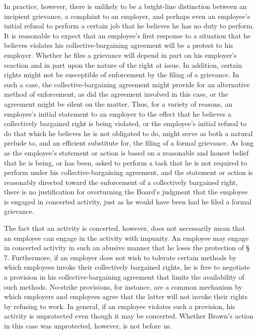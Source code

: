 \documentclass[
  letterpaper,
  11pt,
  DIV=9,
  openright]{scrbook}
\begin{document}
In practice, however, there is unlikely to be a bright-line distinction
between an incipient grievance, a complaint to an employer, and perhaps
even an employee's initial refusal to perform a certain job that he
believes he has no duty to perform. It is reasonable to expect that an
employee's first response to a situation that he believes violates his
collective-bargaining agreement will be a protest to his employer.
Whether he files a grievance will depend in part on his employer's
reaction and in part upon the nature of the right at issue. In addition,
certain rights might not be susceptible of enforcement by the filing of
a grievance. In such a case, the collective-bargaining agreement might
provide for an alternative method of enforcement, as did the agreement
involved in this case, or the agreement might be silent on the matter.
Thus, for a variety of reasons, an employee's initial statement to an
employer to the effect that he believes a collectively bargained right
is being violated, or the employee's initial refusal to do that which he
believes he is not obligated to do, might serve as both a natural
prelude to, and an efficient substitute for, the filing of a formal
grievance. As long as the employee's statement or action is based on a
reasonable and honest belief that he is being, or has been, asked to
perform a task that he is not required to perform under his
collective-bargaining agreement, and the statement or action is
reasonably directed toward the enforcement of a collectively bargained
right, there is no justification for overturning the Board's judgment
that the employee is engaged in concerted activity, just as he would
have been had he filed a formal grievance.

The fact that an activity is concerted, however, does not necessarily
mean that an employee can engage in the activity with impunity. An
employee may engage in concerted activity in such an abusive manner that
he loses the protection of § 7. Furthermore, if an employer does not
wish to tolerate certain methods by which employees invoke their
collectively bargained rights, he is free to negotiate a provision in
his collective-bargaining agreement that limits the availability of such
methods. No-strike provisions, for instance, are a common mechanism by
which employers and employees agree that the latter will not invoke
their rights by refusing to work. In general, if an employee violates
such a provision, his activity is unprotected even though it may be
concerted. Whether Brown's action in this case was unprotected, however,
is not before us.
\end{document}
